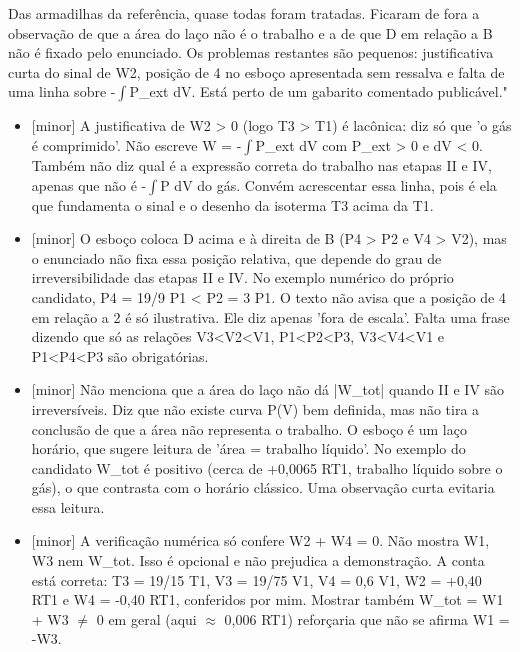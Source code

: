 \documentclass{article}%
\begin{document}
\newline%
Das armadilhas da referência, quase todas foram tratadas. Ficaram de fora a observação de que a área do laço não é o trabalho e a de que D em relação a B não é fixado pelo enunciado. Os problemas restantes são pequenos: justificativa curta do sinal de W2, posição de 4 no esboço apresentada sem ressalva e falta de uma linha sobre -$\int$P\_ext dV. Está perto de um gabarito comentado publicável."%
\begin{itemize}%
\item%
{[}minor{]} A justificativa de W2 > 0 (logo T3 > T1) é lacônica: diz só que 'o gás é comprimido'. Não escreve W = -$\int$P\_ext dV com P\_ext > 0 e dV < 0. Também não diz qual é a expressão correta do trabalho nas etapas II e IV, apenas que não é -$\int$P dV do gás. Convém acrescentar essa linha, pois é ela que fundamenta o sinal e o desenho da isoterma T3 acima da T1.%
\item%
{[}minor{]} O esboço coloca D acima e à direita de B (P4 > P2 e V4 > V2), mas o enunciado não fixa essa posição relativa, que depende do grau de irreversibilidade das etapas II e IV. No exemplo numérico do próprio candidato, P4 = 19/9 P1 < P2 = 3 P1. O texto não avisa que a posição de 4 em relação a 2 é só ilustrativa. Ele diz apenas 'fora de escala'. Falta uma frase dizendo que só as relações V3<V2<V1, P1<P2<P3, V3<V4<V1 e P1<P4<P3 são obrigatórias.%
\item%
{[}minor{]} Não menciona que a área do laço não dá |W\_tot| quando II e IV são irreversíveis. Diz que não existe curva P(V) bem definida, mas não tira a conclusão de que a área não representa o trabalho. O esboço é um laço horário, que sugere leitura de 'área = trabalho líquido'. No exemplo do candidato W\_tot é positivo (cerca de +0,0065 RT1, trabalho líquido sobre o gás), o que contrasta com o horário clássico. Uma observação curta evitaria essa leitura.%
\item%
{[}minor{]} A verificação numérica só confere W2 + W4 = 0. Não mostra W1, W3 nem W\_tot. Isso é opcional e não prejudica a demonstração. A conta está correta: T3 = 19/15 T1, V3 = 19/75 V1, V4 = 0,6 V1, W2 = +0,40 RT1 e W4 = -0,40 RT1, conferidos por mim. Mostrar também W\_tot = W1 + W3 $\neq$ 0 em geral (aqui $\approx$ 0,006 RT1) reforçaria que não se afirma W1 = -W3.%
\end{itemize}%
\end{document}
